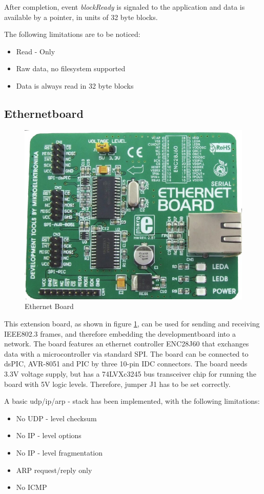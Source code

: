 After completion, event \textit{blockReady} is signaled to the application and data is available by a pointer, in units of 32 byte blocks. 



The following limitations are to be noticed:

\begin{itemize}
 \item Read - Only
 \item Raw data, no filesystem supported
 \item Data is always read in 32 byte blocks
\end{itemize}



\subsection{Ethernetboard}


\begin{figure}[h]
 \centerline{\includegraphics[width=.5\columnwidth]{pics/Ethernetboard.png}}
  \caption{Ethernet Board}
  \label{fig:ethernetboard}
\end{figure}

This extension board, as shown in figure \ref{fig:ethernetboard}, can be used for sending and receiving IEEE802.3 frames, and therefore embedding the developmentboard into a network. The board features an ethernet controller ENC28J60 that exchanges data with a microcontroller via standard SPI. The board can be connected to dsPIC, AVR-8051 and PIC by three 10-pin IDC connectors. The board needs 3.3V voltage supply, but has a 74LVXc3245 bus transceiver chip for running the board with 5V logic levels. Therefore, jumper J1 has to be set correctly.

A basic udp/ip/arp - stack has been implemented, with the following limitations:

\begin{itemize}
 \item No UDP - level checksum
 \item No IP - level options
 \item No IP - level fragmentation
 \item ARP request/reply only
 \item No ICMP
\end{itemize}

